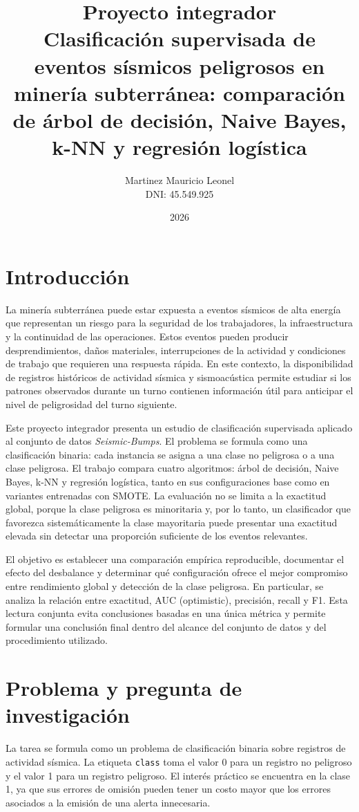 \documentclass[12pt,a4paper]{article}
\title{Proyecto integrador\\[0.75em]Clasificación supervisada de eventos sísmicos peligrosos en minería subterránea: comparación de árbol de decisión, Naive Bayes, k-NN y regresión logística}
\author{Martinez Mauricio Leonel\\DNI: 45.549.925}
\date{2026}
\begin{document}
\maketitle

\section{Introducción}
La minería subterránea puede estar expuesta a eventos sísmicos de alta energía que representan un riesgo para la seguridad de los trabajadores, la infraestructura y la continuidad de las operaciones. Estos eventos pueden producir desprendimientos, daños materiales, interrupciones de la actividad y condiciones de trabajo que requieren una respuesta rápida. En este contexto, la disponibilidad de registros históricos de actividad sísmica y sismoacústica permite estudiar si los patrones observados durante un turno contienen información útil para anticipar el nivel de peligrosidad del turno siguiente.

Este proyecto integrador presenta un estudio de clasificación supervisada aplicado al conjunto de datos \textit{Seismic-Bumps}. El problema se formula como una clasificación binaria: cada instancia se asigna a una clase no peligrosa o a una clase peligrosa. El trabajo compara cuatro algoritmos: árbol de decisión, Naive Bayes, k-NN y regresión logística, tanto en sus configuraciones base como en variantes entrenadas con SMOTE. La evaluación no se limita a la exactitud global, porque la clase peligrosa es minoritaria y, por lo tanto, un clasificador que favorezca sistemáticamente la clase mayoritaria puede presentar una exactitud elevada sin detectar una proporción suficiente de los eventos relevantes.

El objetivo es establecer una comparación empírica reproducible, documentar el efecto del desbalance y determinar qué configuración ofrece el mejor compromiso entre rendimiento global y detección de la clase peligrosa. En particular, se analiza la relación entre exactitud, AUC (optimistic), precisión, recall y F1. Esta lectura conjunta evita conclusiones basadas en una única métrica y permite formular una conclusión final dentro del alcance del conjunto de datos y del procedimiento utilizado.

\section{Problema y pregunta de investigación}
La tarea se formula como un problema de clasificación binaria sobre registros de actividad sísmica. La etiqueta \texttt{class} toma el valor 0 para un registro no peligroso y el valor 1 para un registro peligroso. El interés práctico se encuentra en la clase 1, ya que sus errores de omisión pueden tener un costo mayor que los errores asociados a la emisión de una alerta innecesaria.
\end{document}
